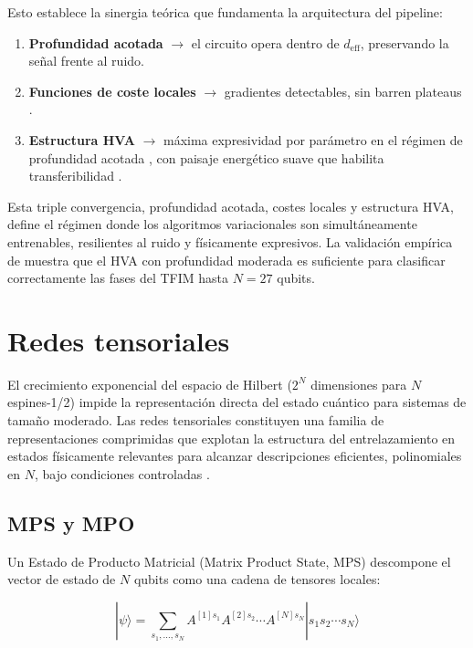 \documentclass[11pt,a4paper,spanish]{book}
\begin{document}
Esto establece la sinergia teórica que fundamenta la arquitectura del pipeline:
\begin{enumerate}
    \item \textbf{Profundidad acotada} $\to$ el circuito opera dentro de $d_{\text{eff}}$, preservando la señal frente al ruido.
    \item \textbf{Funciones de coste locales} $\to$ gradientes detectables, sin barren plateaus \citep{cerezo2021}.
    \item \textbf{Estructura HVA} $\to$ máxima expresividad por parámetro en el régimen de profundidad acotada \citep{wiersema2020}, con paisaje energético suave que habilita transferibilidad \citep{mele2022}.
\end{enumerate}

\noindent Esta triple convergencia, profundidad acotada, costes locales y estructura HVA, define el régimen donde los algoritmos variacionales son simultáneamente entrenables, resilientes al ruido y físicamente expresivos. La validación empírica de \citet{tripathi2026} muestra que el HVA con profundidad moderada es suficiente para clasificar correctamente las fases del TFIM hasta $N = 27$ qubits.


\section{Redes tensoriales}
\label{sec:tensor_networks}

El crecimiento exponencial del espacio de Hilbert ($2^N$ dimensiones para $N$ espines-1/2) impide la representación directa del estado cuántico para sistemas de tamaño moderado. Las redes tensoriales constituyen una familia de representaciones comprimidas que explotan la estructura del entrelazamiento en estados físicamente relevantes para alcanzar descripciones eficientes, polinomiales en $N$, bajo condiciones controladas \citep{schollwock2011}.

\subsection{MPS y MPO}

Un Estado de Producto Matricial (Matrix Product State, MPS) descompone el vector de estado de $N$ qubits como una cadena de tensores locales:

\begin{equation}
|\psi\rangle = \sum_{s_1, \ldots, s_N} A^{[1]s_1} A^{[2]s_2} \cdots A^{[N]s_N} |s_1 s_2 \cdots s_N\rangle
\label{eq:mps}
\end{equation}
\end{document}
